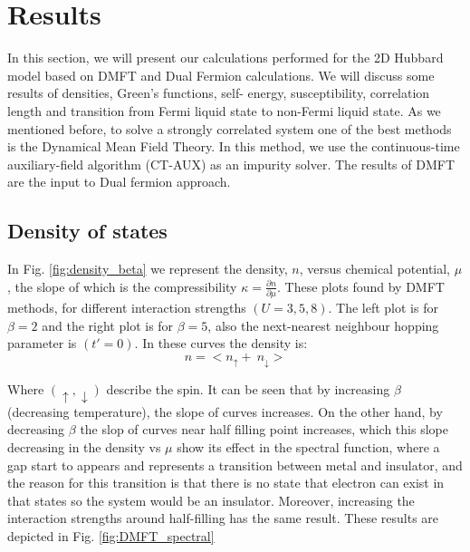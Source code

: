 \chapter{Results}

In this section, we will present our calculations performed for the 2D Hubbard model based on DMFT and Dual Fermion calculations. We will discuss some results of densities, Green's functions, self- energy, susceptibility, correlation length and transition from Fermi liquid state to non-Fermi liquid state. 
As we mentioned before, to solve a strongly correlated system one of the best methods is the Dynamical Mean Field Theory. In this method, we use the continuous-time auxiliary-field algorithm (CT-AUX) as an impurity solver. The results of DMFT are the input to Dual fermion approach.



\section{Density of states}

In Fig. \ref{fig:density_beta} we represent the density, $n$, versus chemical potential, $\mu$ , the slope of which is the compressibility $\kappa= \frac{\partial n}{\partial \mu}$. These plots found by DMFT methods, for different interaction strengths $(U=3, 5, 8)$. The left plot is for $\beta=2$ and the right plot is for $\beta=5$, also the next-nearest neighbour hopping parameter is $(t'=0)$. In these curves the density is:
\begin{equation}
    n=<n_{\uparrow}+\: n_{\downarrow}>
\end{equation}

Where $(\uparrow, \downarrow)$ describe the spin. It can be seen that by increasing $\beta$ (decreasing temperature), the slope of curves increases. On the other hand, by decreasing $\beta$ the slop of curves near half filling point  
increases, which this slope decreasing in the density vs $\mu$  show its effect in the spectral function, where a gap start to appears and represents a transition between metal and insulator, and the reason for this transition is that there is no state that electron can exist in that states so the system would be an insulator. Moreover, increasing the interaction strengths around half-filling has the same result. These results are depicted in Fig. \ref{fig:DMFT_spectral}
 

